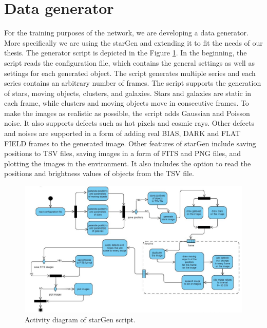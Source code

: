 \section{Data generator} \label{sec:sdgenerator}

For the training purposes of the network, we are developing a data generator. More specifically we are using the starGen and extending it to fit the needs of our thesis. The generator script is depicted in the Figure \ref{img:starGenActiviyDiagram}. 
In the beginning, the script reads the configuration file, which contains the general settings as well as settings for each generated object. The script generates multiple series and each series contains an arbitrary number of frames. The script supports the generation of stars, moving objects, clusters, and galaxies. Stars and galaxies are static in each frame, while clusters and moving objects move in consecutive frames. To make the images as realistic as possible, the script adds Gaussian and Poisson noise. It also supports defects such as hot pixels and cosmic rays. Other defects and noises are supported in a form of adding real BIAS, DARK and FLAT FIELD frames to the generated image. Other features of starGen include saving positions to TSV files, saving images in a form of FITS and PNG files, and plotting the images in the environment. It also includes the option to read the positions and brightness values of objects from the TSV file. 

\begin{figure}[h]
    \centering
    \includegraphics[width=\textwidth]{images/starGen2.jpg}
    \caption{Activity diagram of starGen script.}
    \label{img:starGenActiviyDiagram}
\end{figure}






